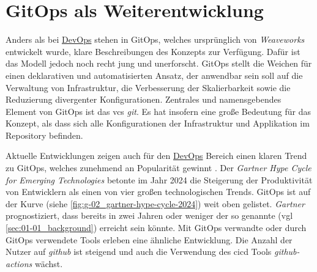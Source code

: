 \section{GitOps als Weiterentwicklung}
\label{sec:03-03_gitops-as-further-evolution}

Anders als bei \hyperref[sec:03-01_introduction-to-devops]{DevOps} stehen in GitOps, welches ursprünglich von \textit{Weaveworks} entwickelt wurde, klare Beschreibungen des Konzepts zur Verfügung. Dafür ist das Modell jedoch noch recht jung und unerforscht. \cite{009:GitOps-Evolution-of-DevOps} GitOps stellt die Weichen für einen deklarativen und automatisierten Ansatz, der anwendbar sein soll auf die Verwaltung von Infrastruktur, die Verbesserung der Skalierbarkeit sowie die Reduzierung divergenter Konfigurationen. Zentrales und namensgebendes Element von GitOps ist das \Gls{vcs} \textit{\Gls{git}}. Es hat insofern eine große Bedeutung für das Konzept, als dass sich alle Konfigurationen der Infrastruktur und Applikation im Repository befinden. \cite{024:Investiugating-Impact-of-Containerization-on-Deployment-Process-in-DevOps}

Aktuelle Entwicklungen zeigen auch für den \hyperref[sec:03-01_introduction-to-devops]{DevOps} Bereich einen klaren Trend zu GitOps, welches zunehmend an Popularität gewinnt \cite{024:Investiugating-Impact-of-Containerization-on-Deployment-Process-in-DevOps}. Der \textit{Gartner Hype Cycle for Emerging Technologies} betonte im Jahr 2024 die Steigerung der Produktivität von Entwicklern als einen von vier großen technologischen Trends. GitOps ist auf der Kurve (siehe \autoref{fig:g-02_gartner-hype-cycle-2024}) weit oben gelistet. \textit{Gartner} prognostiziert, dass bereits in zwei Jahren oder weniger der so genannte  (\acrshort{vgl} \autoref{sec:01-01_background}) erreicht sein könnte. \cite{106:Gartner-2024-Hype-Cycle-for-Emerging-Technologies} Mit GitOps verwandte oder durch GitOps verwendete Tools erleben eine ähnliche Entwicklung. Die Anzahl der Nutzer auf \textit{\Gls{github}} ist steigend und auch die Verwendung des \Gls{cicd} Tools \textit{\Gls{github-actions}} wächst. \cite{008:GitOps-Approach-to-Cloud-Cluster-System-Deployment}

